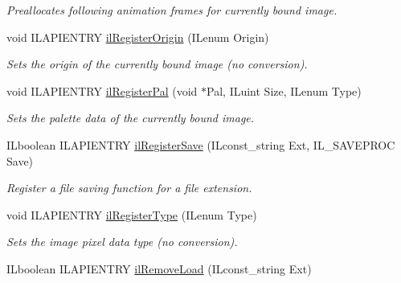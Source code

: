 \begin{DoxyCompactItemize}
\begin{DoxyCompactList}\small\item\em Preallocates following animation frames for currently bound image. \end{DoxyCompactList}\item 
void I\-L\-A\-P\-I\-E\-N\-T\-R\-Y \hyperlink{group__register_ga79cd7bac1b68d6e78fa585fb57754b97}{il\-Register\-Origin} (I\-Lenum Origin)
\begin{DoxyCompactList}\small\item\em Sets the origin of the currently bound image (no conversion). \end{DoxyCompactList}\item 
\hypertarget{group__register_ga66dfc863bb20e62978f3fe613a8de007}{void I\-L\-A\-P\-I\-E\-N\-T\-R\-Y \hyperlink{group__register_ga66dfc863bb20e62978f3fe613a8de007}{il\-Register\-Pal} (void $\ast$Pal, I\-Luint Size, I\-Lenum Type)}\label{group__register_ga66dfc863bb20e62978f3fe613a8de007}

\begin{DoxyCompactList}\small\item\em Sets the palette data of the currently bound image. \end{DoxyCompactList}\item 
\hypertarget{group__register_ga9e630bbaa6a19e4f0a2438bd552ee563}{I\-Lboolean I\-L\-A\-P\-I\-E\-N\-T\-R\-Y \hyperlink{group__register_ga9e630bbaa6a19e4f0a2438bd552ee563}{il\-Register\-Save} (I\-Lconst\-\_\-string Ext, I\-L\-\_\-\-S\-A\-V\-E\-P\-R\-O\-C Save)}\label{group__register_ga9e630bbaa6a19e4f0a2438bd552ee563}

\begin{DoxyCompactList}\small\item\em Register a file saving function for a file extension. \end{DoxyCompactList}\item 
void I\-L\-A\-P\-I\-E\-N\-T\-R\-Y \hyperlink{group__register_gac327753a4ba7fa0e4aa04ee8a351d619}{il\-Register\-Type} (I\-Lenum Type)
\begin{DoxyCompactList}\small\item\em Sets the image pixel data type (no conversion). \end{DoxyCompactList}\item 
\hypertarget{group__register_ga388f0a90bbfee28bc2bebf0dd2b336e2}{I\-Lboolean I\-L\-A\-P\-I\-E\-N\-T\-R\-Y \hyperlink{group__register_ga388f0a90bbfee28bc2bebf0dd2b336e2}{il\-Remove\-Load} (I\-Lconst\-\_\-string Ext)}\label{group__register_ga388f0a90bbfee28bc2bebf0dd2b336e2}


\end{DoxyCompactItemize}
